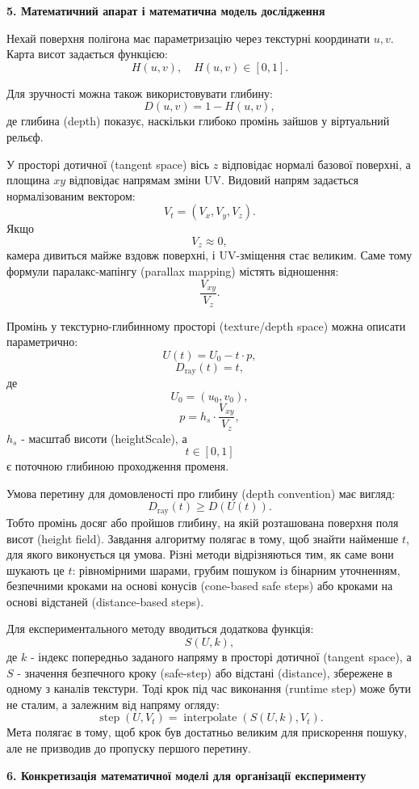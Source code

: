 \documentclass[14pt,a4paper]{extarticle}
\newcommand{\eng}[1]{\foreignlanguage{english}{#1}}
\newcommand{\sectiontitle}[1]{%
  \par\vspace{\baselineskip}%
  \noindent\textbf{#1}\par
}
\begin{document}
\sectiontitle{5. Математичний апарат і математична модель дослідження}

Нехай поверхня полігона має параметризацію через текстурні координати $u, v$. Карта висот задається функцією:
\[
H(u,v), \quad H(u,v) \in [0,1].
\]

Для зручності можна також використовувати глибину:
\[
D(u,v)=1-H(u,v),
\]
де глибина (\eng{depth}) показує, наскільки глибоко промінь зайшов у віртуальний рельєф.

У просторі дотичної (\eng{tangent space}) вісь $z$ відповідає нормалі базової поверхні, а площина $xy$ відповідає напрямам зміни UV. Видовий напрям задається нормалізованим вектором:
\[
V_t=(V_x,V_y,V_z).
\]
Якщо
\[
V_z \approx 0,
\]
камера дивиться майже вздовж поверхні, і UV-зміщення стає великим. Саме тому формули паралакс-мапінгу (\eng{parallax mapping}) містять відношення:
\[
\frac{V_{xy}}{V_z}.
\]

Промінь у текстурно-глибинному просторі (\eng{texture/depth space}) можна описати параметрично:
\[
U(t)=U_0-t\cdot p,
\]
\[
D_{\mathrm{ray}}(t)=t,
\]
де
\[
U_0=(u_0,v_0),
\]
\[
p=h_s\cdot\frac{V_{xy}}{V_z},
\]
$h_s$ - масштаб висоти (\eng{heightScale}), а
\[
t\in[0,1]
\]
є поточною глибиною проходження променя.

Умова перетину для домовленості про глибину (\eng{depth convention}) має вигляд:
\[
D_{\mathrm{ray}}(t)\geq D(U(t)).
\]
Тобто промінь досяг або пройшов глибину, на якій розташована поверхня поля висот (\eng{height field}). Завдання алгоритму полягає в тому, щоб знайти найменше $t$, для якого виконується ця умова. Різні методи відрізняються тим, як саме вони шукають це $t$: рівномірними шарами, грубим пошуком із бінарним уточненням, безпечними кроками на основі конусів (\eng{cone-based safe steps}) або кроками на основі відстаней (\eng{distance-based steps}).

Для експериментального методу вводиться додаткова функція:
\[
S(U,k),
\]
де $k$ - індекс попередньо заданого напряму в просторі дотичної (\eng{tangent space}), а $S$ - значення безпечного кроку (\eng{safe-step}) або відстані (\eng{distance}), збережене в одному з каналів текстури. Тоді крок під час виконання (\eng{runtime step}) може бути не сталим, а залежним від напряму огляду:
\[
\operatorname{step}(U,V_t)=\operatorname{interpolate}(S(U,k),V_t).
\]
Мета полягає в тому, щоб крок був достатньо великим для прискорення пошуку, але не призводив до пропуску першого перетину.

\sectiontitle{6. Конкретизація математичної моделі для організації експерименту}
\end{document}
